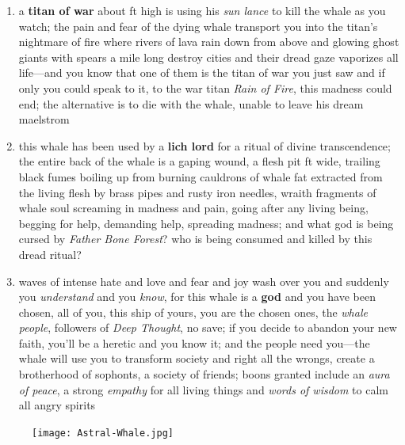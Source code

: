 \documentclass[11pt]{bxart}
\begin{document}
\begin{enumerate}
\item a \textbf{titan of war} about \unit[200]{ft} high is using his
  \textit{sun lance} to kill the whale as you watch; the pain and fear
  of the dying whale transport you into the titan's nightmare of fire
  where rivers of lava rain down from above and glowing ghost giants
  with spears a mile long destroy cities and their dread gaze
  vaporizes all life—and you know that one of them is the titan of war
  you just saw and if only you could speak to it, to the war titan
  \textit{Rain of Fire}, this madness could end; the alternative is to
  die with the whale, unable to leave his dream maelstrom

\item this whale has been used by a \textbf{lich lord} for a ritual of
  divine transcendence; the entire back of the whale is a gaping
  wound, a flesh pit \unit[500]{ft} wide, trailing black fumes boiling up from
  burning cauldrons of whale fat extracted from the living flesh by
  brass pipes and rusty iron needles, wraith fragments of whale soul
  screaming in madness and pain, going after any living being, begging
  for help, demanding help, spreading madness; and what god is being
  cursed by \textit{Father Bone Forest}? who is being consumed and
  killed by this dread ritual?

\item waves of intense hate and love and fear and joy wash over you
  and suddenly you \textit{understand} and you \textit{know}, for this
  whale is a \textbf{god} and you have been chosen, all of you, this
  ship of yours, you are the chosen ones, the \textit{whale people},
  followers of \textit{Deep Thought}, no save; if you decide to
  abandon your new faith, you'll be a heretic and you know it; and the
  people need you—the whale will use you to transform society and
  right all the wrongs, create a brotherhood of sophonts, a society of
  friends; boons granted include an \textit{aura of peace}, a strong
  \textit{empathy} for all living things and \textit{words of wisdom}
  to calm all angry spirits
\end{enumerate}

\begin{figure}[h]
  \centering
  \texttt{[image: Astral-Whale.jpg]}
\end{figure}
\end{document}
